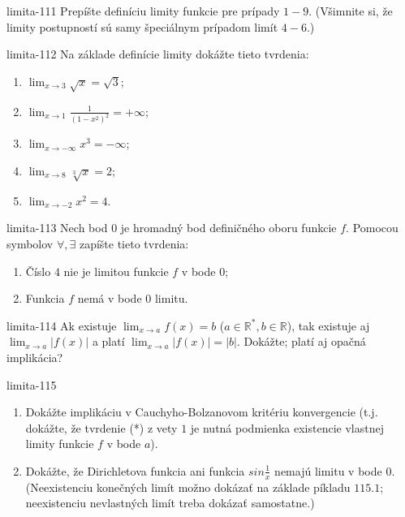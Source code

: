 \begin{defproblem}{limita-111}
Prepíšte definíciu limity funkcie pre prípady $1-9$. (Všimnite si, že limity postupností sú samy špeciálnym prípadom limít $4-6$.)
\end{defproblem}

\begin{defproblem}{limita-112}
Na základe definície limity dokážte tieto tvrdenia:
\begin{multicols}{2}
\begin{enumerate}
\item $\lim_{x \rightarrow 3} \sqrt{x}=\sqrt{3}$;
\item $\lim_{x \rightarrow 1} \frac{1}{(1-x^2)^2}=+\infty$;
\item $\lim_{x \rightarrow -\infty}x^3=-\infty$;
\item $\lim_{x \rightarrow 8} \sqrt[3]{x}=2$;
\item $\lim_{x \rightarrow -2} x^2=4$.
\end{enumerate}
\end{multicols}
\end{defproblem}

\begin{defproblem}{limita-113}
Nech bod $0$ je hromadný bod definičného oboru funkcie $f$. Pomocou symbolov $\forall, \exists$ zapíšte tieto tvrdenia:
\begin{enumerate}
\item Číslo $4$ nie je limitou funkcie $f$ v bode $0$;
\item Funkcia $f$ nemá v bode $0$ limitu.
\end{enumerate}
\end{defproblem}

\begin{defproblem}{limita-114}
Ak existuje $\lim_{x \rightarrow a} f(x)=b$ ($a \in \mathbb{R^*},b \in \mathbb{R}$), tak existuje aj $\lim_{x \rightarrow a} |f(x)|$ a platí $\lim_{x \rightarrow a} |f(x)|=|b|$. Dokážte; platí aj opačná implikácia?
\end{defproblem}

\begin{defproblem}{limita-115}
\begin{enumerate}
\item Dokážte implikáciu v Cauchyho-Bolzanovom kritériu konvergencie (t.j. dokážte, že tvrdenie (*) z vety $1$ je nutná podmienka existencie vlastnej limity funkcie $f$ v bode $a$).
\item Dokážte, že Dirichletova funkcia ani funkcia $sin \frac{1}{x}$ nemajú limitu v bode $0$. (Neexistenciu konečných limít možno dokázať na základe píkladu $115.1$; neexistenciu nevlastných limít treba dokázať samostatne.)
\end{enumerate}
\end{defproblem}

